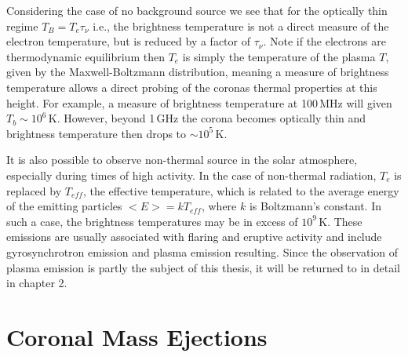 Considering the case of no background source we see that for the optically thin regime $T_B = T_e\tau_{\nu}$ i.e., the brightness temperature is not a direct measure of the electron temperature, but is reduced by a factor of $\tau_{\nu}$. Note if the electrons are thermodynamic equilibrium then $T_e$ is simply the temperature of the plasma $T$, given by the Maxwell-Boltzmann distribution, meaning  a measure of brightness temperature allows a direct probing of the coronas thermal properties at this height. For example, a measure of brightness temperature at 100\,MHz will given $T_b\sim10^6$\,K. However, beyond 1\,GHz the corona becomes optically thin and brightness temperature then drops to $\sim10^{5}$\,K. 

It is also possible to observe non-thermal source in the solar atmosphere, especially during times of high activity. In the case of non-thermal radiation, $T_e$ is replaced by $T_{eff}$, the effective temperature, which is related to the average energy of the emitting particles $<E>=kT_{eff}$, where $k$ is Boltzmann's constant. In such a case, the brightness temperatures may be in excess of $10^{9}$\,K. These emissions are usually associated with flaring and eruptive activity and include gyrosynchrotron emission and plasma emission resulting. Since the observation of plasma emission is partly the subject of this thesis, it will be returned to in detail in chapter 2.




\section{Coronal Mass Ejections}\label{sec:2}


